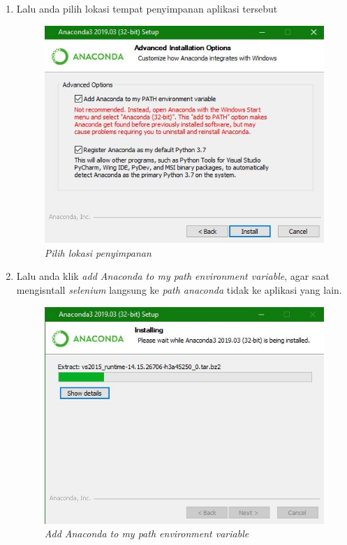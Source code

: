 \begin{enumerate}
\item Lalu anda pilih lokasi tempat penyimpanan aplikasi tersebut

\begin{figure}[!htbp]
    \centering
    \includegraphics[scale=0.6]{gambar/5.jpg}
    \caption{\textit{Pilih lokasi penyimpanan}}
    \label{Figure5}
\end{figure}

\item Lalu anda klik \textit{add Anaconda to my path environment variable}, agar saat mengisntall \textit{selenium }langsung ke \textit{path anaconda} tidak ke aplikasi yang lain.

\begin{figure}[!htbp]
    \centering
    \includegraphics[scale=0.6]{gambar/6.jpg}
    \caption{\textit{Add Anaconda to my path environment variable}}
    \label{Figure6}
\end{figure}


\end{enumerate}
